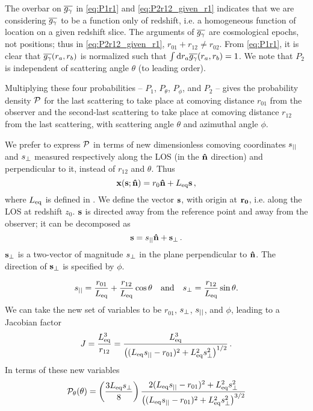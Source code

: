 \documentclass[fleqn,usenatbib]{mnras}
\begin{document}
    The overbar on $\overline{g_\gamma}$ in \autoref{eq:P1r1} and \ref{eq:P2r12_given_r1}
    indicates that we are considering $\overline{g_\gamma}$ to be a function only of
    redshift, i.e. a homogeneous function of location on a given redshift slice.
    The arguments of $\overline{g_\gamma}$ are cosmological epochs, not positions; thus in
    \autoref{eq:P2r12_given_r1}, $r_{01}+r_{12} \neq r_{02}$.  From
    \autoref{eq:P1r1}, it is clear that $\overline{g_\gamma}(r_a,r_b)$ is normalized such
    that $\int\dif{r_a} \GgamBar(r_a,r_b)=1$.  We note that $P_2$ is independent
    of scattering angle $\theta$ (to leading order).

    Multiplying these four probabilities -- $P_1$, $P_\theta$, $P_\phi$, and
    $P_2$ -- gives the probability density $\mathcal{P}$ for the last scattering to
    take place at comoving distance $r_{01}$ from the observer and the
    second-last scattering to take place at comoving distance $r_{12}$ from the
    last scattering, with scattering angle $\theta$ and azimuthal angle $\phi$.

    We prefer to express $\mathcal{P}$ in terms of new dimensionless comoving
    coordinates $s_{||}$ and $s_{\perp}$ measured respectively along the LOS (in the
    ${\bf\hat{n}}$ direction) and perpendicular to it, instead of $r_{12}$ and
    $\theta$.%
    Thus
    \begin{equation} \label{eq:xofs}
        \mathbf{x}(\mathbf{s};{\bf\hat{n}}) = r_0 {\bf\hat{n}} + L_{\rm eq}\mathbf{s}\,,
    \end{equation}
    where $L_{\rm eq}$ is defined in .  We define the
    vector $\mathbf{s}$, with origin at $\mathbf{r_0}$, i.e. along the LOS at redshift
    $z_0$.  $\mathbf{s}$ is directed away from the reference point and away from
    the observer; it can be decomposed as
    \begin{equation}
        \mathbf{s} = s_{||} {\bf\hat{n}} + \mathbf{s}_\perp \,.
    \end{equation}
    $\mathbf{s}_\perp$ is a two-vector of magnitude $s_{\perp}$ in the plane
    perpendicular to ${\bf\hat{n}}$.  The direction of $\mathbf{s}_\perp$ is specified by
    $\phi$.

    \begin{equation} \label{eq:s_definition}
        s_{||} = \frac{r_{01}}{L_{\rm eq}} + \frac{r_{12}}{L_{\rm eq}}\cos\theta \quad \mathrm{and}\quad
        s_{\perp} = \frac{r_{12}}{L_{\rm eq}}\sin\theta.
    \end{equation}
    We can take the new set of variables to be $r_{01}$, $s_{\perp}$, $s_{||}$, and
    $\phi$, leading to a Jacobian factor
    \begin{equation} \label{eq:r2s_jacobian}
        J = \frac{L_{\rm eq}^3}{r_{12}}
          = \frac{L_{\rm eq}^3}{\left((L_{\rm eq} s_{||}-r_{01})^2 + L_{\rm eq}^2s_{\perp}^2\right)^{1/2}}\,.
    \end{equation}
    In terms of these new variables
    \begin{equation}
        \mathcal{P}_\theta(\theta)
          = \left( \frac{3L_{\rm eq}s_{\perp}}{8} \right)
            \frac{2(L_{\rm eq} s_{||}-r_{01})^2 + L_{\rm eq}^2s_{\perp}^2}
                 {\left((L_{\rm eq} s_{||}-r_{01})^2 + L_{\rm eq}^2s_{\perp}^2\right)^{3/2}}
    \end{equation}
\end{document}
